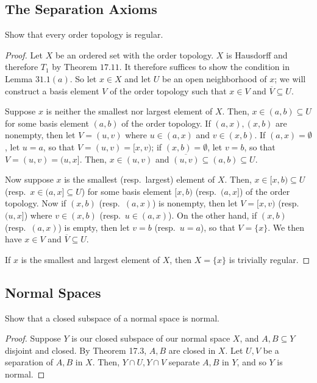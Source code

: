 \documentclass[12pt]{article}
\theoremstyle{remark}
\begin{document}
\subsection{The Separation Axioms}
\setcounter{subsubsection}{2}
\begin{problem}
  Show that every order topology is regular.
\end{problem}
\begin{proof}
  Let $X$ be an ordered set with the order topology. $X$ is Hausdorff and
  therefore $T_1$ by Theorem $17.11$. It therefore suffices to show the
  condition in Lemma $31.1(a)$. So let $x \in X$ and let $U$ be an open
  neighborhood of $x$; we will construct a basis element $V$ of the order
  topology such that $x \in V$ and $\overline{V} \subseteq U$.
  \par Suppose $x$ is neither the smallest nor largest element of $X$. Then, $x
  \in (a,b) \subseteq U$ for some basis element $(a,b)$ of the order topology.
  If $(a,x),(x,b)$ are nonempty, then let $V = (u,v)$ where $u \in (a,x)$ and
  $v \in (x,b)$. If $(a,x) = \emptyset$, let $u=a$, so that $V = (u,v) = [x,v)$; if
  $(x,b) = \emptyset$, let $v=b$, so that $V = (u,v) = (u,x]$.
  Then, $x \in (u,v)$ and $\overline{(u,v)} \subseteq (a,b) \subseteq U$.
  \par Now suppose $x$ is the smallest (resp.~largest) element of $X$. Then, $x
  \in [x,b) \subseteq U$ (resp.~$x \in (a,x] \subseteq U$) for some basis
  element $[x,b)$ (resp.~$(a,x]$) of the order topology. Now if $(x,b)$
  (resp.~$(a,x)$) is nonempty, then let $V = [x,v)$ (resp.~$(u,x]$) where
  $v \in (x,b)$ (resp.~$u \in (a,x)$). On the other hand, if $(x,b)$
  (resp.~$(a,x)$) is empty, then let $v=b$ (resp.~$u=a$), so that $V = \{x\}$.
  We then have $x \in V$ and $\overline{V} \subseteq U$.
  \par If $x$ is the smallest and largest element of $X$, then $X = \{x\}$ is
  trivially regular.
\end{proof}

\subsection{Normal Spaces}
\begin{problem}
  Show that a closed subspace of a normal space is normal.
\end{problem}
\begin{proof}
  Suppose $Y$ is our closed subspace of our normal space $X$, and $A,B \subseteq Y$ disjoint and closed. By Theorem 17.3, $A,B$ are closed in $X$. Let $U,V$ be a separation of $A,B$ in $X$. Then, $Y \cap U, Y \cap V$ separate $A,B$ in $Y$, and so $Y$ is normal.
\end{proof}
\end{document}
